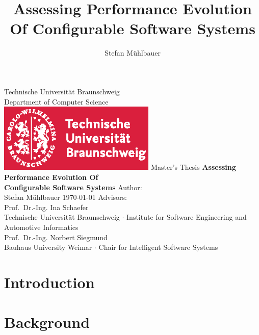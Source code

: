 \documentclass[
	12pt,
	a4paper,
	oneside,
	openright
]{book}
\title{Assessing Performance Evolution Of Configurable Software Systems}
\author{Stefan Mühlbauer}
\begin{document}
\begin{titlepage}
    \centering
    {
    	Technische Universität Braunschweig\\ 
    		\vspace{4mm}
    	Department of Computer Science
    }
    \vspace{1.5cm}\\
    \includegraphics[width=7.5cm]{images/TUBraunschweig_4C} %
    \vfill
    Master's Thesis
    \vfill
    {\bfseries\Huge\linespread{2.0}
        Assessing Performance Evolution Of\\
        	\vspace{3mm}
         Configurable Software Systems
    }  
    \vfill
    {
    	Author:\\
    	\vspace{3mm}
    	{\Large Stefan Mühlbauer}
    }
    \vfill
    \today
    \vfill
    Advisors:\\
    \vspace{3mm}
    {\large Prof.~Dr.-Ing. Ina Schaefer}\\
    \vspace{1mm}
    {Technische Universität Braunschweig $\cdot$ Institute for Software
    Engineering and Automotive Informatics}\\
    \vspace{3mm}
    {\large Prof.~Dr.-Ing. Norbert Siegmund}\\
    \vspace{1mm}
    {Bauhaus University Weimar $\cdot$ Chair for Intelligent Software Systems}
\end{titlepage}


\tableofcontents

\chapter{Introduction}\label{chapter:1}
\setcounter{page}{1}


\chapter{Background}\label{chapter:2}

\end{document}
